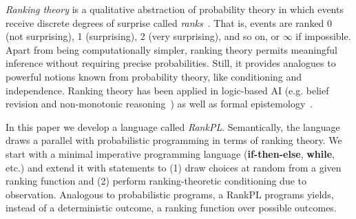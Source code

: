\documentclass{llncs}
\begin{document}
\emph{Ranking theory} is a qualitative abstraction of probability theory in which events receive discrete degrees of surprise called \emph{ranks}~\cite{DBLP:books/daglib/0035277}.
That is, events are ranked 0 (not surprising), 1 (surprising), 2 (very surprising), and so on, or $\infty$ if impossible.
Apart from being computationally simpler,
	ranking theory permits meaningful inference without requiring precise probabilities.
Still, it provides analogues to powerful notions known from probability theory, like conditioning and independence.
Ranking theory has been applied in logic-based AI (e.g. belief revision and non-monotonic reasoning~\cite{DBLP:dblp_journals/ai/DarwicheP97,goldszmidt1996qualitative})
		as well as formal epistemology~\cite{DBLP:books/daglib/0035277}.

In this paper we develop a language called \emph{RankPL}.
Semantically, the language draws a parallel with probabilistic programming in terms of ranking theory.
We start with a minimal imperative programming language (\textbf{if-then-else}, \textbf{while}, etc.)
	and extend it with statements to
	(1) draw choices at random from a given ranking function and
	(2) perform ranking-theoretic conditioning due to observation.
Analogous to probabilistic programs, a RankPL programs yields, instead of a deterministic outcome, a ranking function over possible outcomes.
\end{document}
